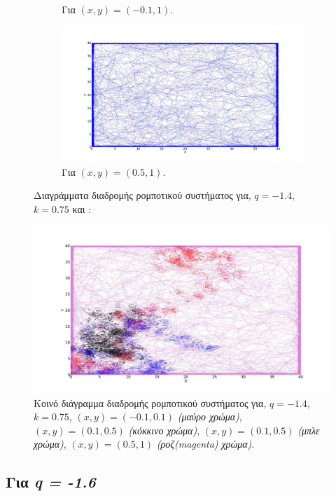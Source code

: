 \begin{figure}[ht]
\begin{subfigure}[b]{0.55\textwidth}
		\caption{Για $(x,y) = (-0.1,1)$.}
		\label{f:g96}
	\end{subfigure}
	\hfill
	\begin{subfigure}[b]{0.55\textwidth}
		\centering
		\includegraphics[width=\textwidth]{LateX images/log/xy/g4-1.4}
		\caption{Για $(x,y) = (0.5,1)$.}
		\label{f:g97}
	\end{subfigure}
	\hfill
	\caption{Διαγράμματα διαδρομής ρομποτικού συστήματος για, $q = -1.4$, $k = 0.75$ και :}
\end{figure}

\begin{figure}[ht]
	\centering
	\includegraphics[width=1\linewidth]{LateX images/log/xy/g2}
	\caption{Κοινό διάγραμμα διαδρομής ρομποτικού συστήματος για, $q = -1.4$, $k = 0.75$, $(x,y) = (-0.1,0.1)$ \emph{(μαύρο χρώμα)}, $(x,y) = (0.1,0.5)$ \emph{(κόκκινο χρώμα)}, $(x,y) = (0.1,0.5)$ \emph{(μπλε χρώμα)}, $(x,y) = (0.5,1)$ \emph{(ροζ(magenta) χρώμα)}.}
	\label{f:g98}	
\end{figure}

\clearpage

\subsection{Για \emph{q = -1.6}}

